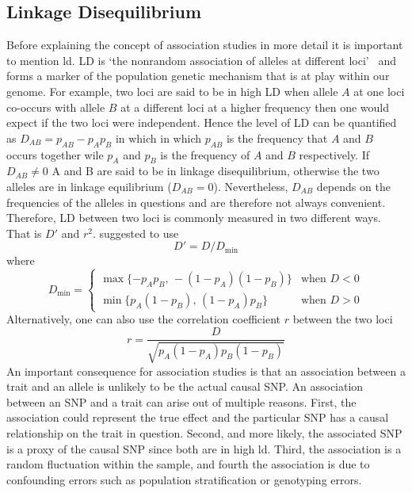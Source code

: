 \documentclass[../header.tex]{subfiles}
\begin{document}
\subsection{Linkage Disequilibrium}
\label{sub:linkage_disequilibrium}

Before explaining the concept of association studies in more detail it is important to mention \acrfull{ld}.
LD is `the nonrandom association of alleles at different loci'~\cite{Slatkin2008} and forms a marker of the population genetic mechanism that is at play within our genome.
For example, two loci are said to be in high LD when allele $A$ at one loci co-occurs with allele $B$ at a different loci at a higher frequency then one would expect if the two loci were independent.
Hence the level of LD can be quantified as $D_{AB}=p_{AB} - p_{A}p_{B}$ in which in which $p_{AB}$ is the frequency that $A$ and $B$ occurs together wile $p_A$ and $p_B$ is the frequency of $A$ and $B$ respectively.
If $D_{AB} \neq 0$ A and B are said to be in linkage disequilibrium, otherwise the two alleles are in linkage equilibrium ($D_{AB}=0$).
Nevertheless, $D_{AB}$ depends on the frequencies of the alleles in questions and are therefore not always convenient.
Therefore, LD between two loci is commonly measured in two different ways. 
That is $D'$ and $r^2$.
\citet{Lewontin1964} suggested to use
\begin{equation}\label{eq:dprime}
  D' = D/D_{\min}
\end{equation}
where 
\begin{equation*}
  D_{\min}= \begin{cases}
    \max\{-p_A p_B,\,-(1-p_A)(1-p_B)\} & \text{when } D < 0\\
    \min\{p_A (1-p_B),\,(1-p_A) p_B\} & \text{when } D > 0
  \end{cases} 
\end{equation*}
Alternatively, one can also use the correlation coefficient $r$ between the two loci 
\begin{equation}\label{eq:r2}
  r=\frac{D}{\sqrt{p_A(1-p_A)p_B (1-p_B)}}
\end{equation}
An important consequence for association studies is that an association between a trait and an allele is unlikely to be the actual causal SNP\@.
An association between an SNP and a trait can arise out of multiple reasons.
First, the association could represent the true effect and the particular SNP has a causal relationship on the trait in question.
Second, and more likely, the associated SNP is a proxy of the causal SNP since both are in high \acrshort{ld}.
Third, the association is a random fluctuation within the sample, and 
fourth the association is due to confounding errors such as population stratification or genotyping errors.
\end{document}
